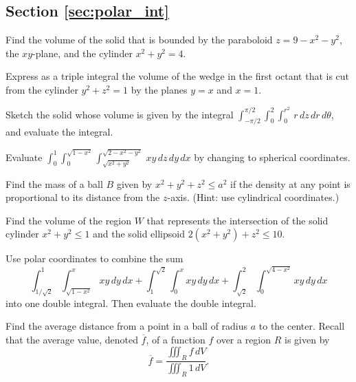 \documentclass[svgnames]{watsonbook}
\begin{document}
\subsection*{Section \ref{sec:polar_int}}

\begin{exercise}{}{}
  Find the volume of the solid that is bounded by the paraboloid
  $z = 9 - x^2 - y^2$, the $xy$-plane, and the cylinder
  $x^2 + y^2 = 4$.
\end{exercise}

\begin{exercise}{}{}
  Express as a triple integral the volume of the wedge in the first
  octant that is cut from the cylinder $y^2+z^2 = 1$ by the planes
  $y=x$ and $x=1$.
\end{exercise}

\begin{exercise}{}{}
  Sketch the solid whose volume is given by the integral
  $\int_{-\pi/2}^{\pi/2} \int_0^2 \int_0^{r^2} \, r\,dz\,dr\,d\theta$,
  and evaluate the integral.
\end{exercise}

\begin{exercise}{}{}
  Evaluate
  $\int_0^1 \int_0^{\sqrt{1-x^2}}
  \int_{\sqrt{x^2+y^2}}^{\sqrt{2-x^2-y^2}} \, xy \, dz \, dy \, dx$ by
  changing to spherical coordinates.
\end{exercise}

\begin{exercise}{}{}
  Find the mass of a ball $B$ given by $x^2+y^2+z^2 \leq a^2$ if the
  density at any point is proportional to its distance from the
  $z$-axis. (Hint: use cylindrical coordinates.)
\end{exercise}


\begin{exercise}{}{}
  Find the volume of the region $W$ that represents the intersection
  of the solid cylinder $x^2+y^2 \leq 1$ and the solid ellipsoid
  $2(x^2+y^2)+z^2\leq 10.$
\end{exercise}

\begin{exercise}{}{}
Use polar coordinates to combine the sum 
\[
\int_{1/\sqrt{2}}^1\int_{\sqrt{1-x^2}}^x xy \, dy \, dx + 
\int_{1}^{\sqrt{2}} \int_0^x xy \,dy \,dx + 
\int_{\sqrt{2}}^2 \int_0^{\sqrt{4-x^2}} xy \,dy \, dx
\]
into one double integral. Then evaluate the double integral.
\end{exercise}

\begin{exercise}{}{}
  Find the average distance from a point in a ball of radius $a$ to
  the center. Recall that the average value, denoted $\overline{f}$,
  of a function $f$ over a region $R$ is given by
  \[
    \overline{f} = \frac{\iiint_R f \, dV}{\iiint_R 1 \, dV}.
  \]
\end{exercise}
\end{document}
